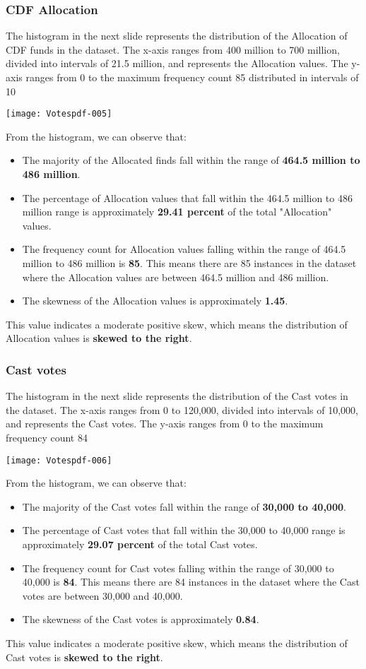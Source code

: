 \documentclass[fleqn,a4paper,12pt]{article}
\begin{document}
\subsubsection{CDF Allocation}

The histogram in the next slide represents the distribution of the Allocation of CDF funds in the dataset. The x-axis ranges from 400 million to 700 million, divided into intervals of 21.5 million, and represents the Allocation values. The y-axis ranges from 0 to the maximum frequency count 85 distributed in intervals of 10

\texttt{[image: Votespdf-005]}
 
From the histogram, we can observe that:
\begin{itemize}
\item The majority of the Allocated finds fall within the range of \textbf{464.5 million to 486 million}.
\item The percentage of Allocation values that fall within the 464.5 million to 486 million range is approximately \textbf{29.41 percent} of the total "Allocation" values.
\item The frequency count for Allocation values falling within the range of 464.5 million to 486 million is \textbf{85}. This means there are 85 instances in the dataset where the Allocation values are between 464.5 million and 486 million.
\item The skewness of the Allocation values is approximately \textbf{1.45}.
\end{itemize}
This value indicates a moderate positive skew, which means the distribution of Allocation values is \textbf{skewed to the right}.
 
\subsubsection{Cast votes}

The histogram in the next slide represents the distribution of the Cast votes in the dataset. The x-axis ranges from 0 to 120,000, divided into intervals of 10,000, and represents the Cast votes. The y-axis ranges from 0 to the maximum frequency count 84
 

\texttt{[image: Votespdf-006]}

 
From the histogram, we can observe that:
\begin{itemize}
\item The majority of the Cast votes fall within the range of \textbf{30,000 to 40,000}.
\item The percentage of Cast votes that fall within the 30,000 to 40,000 range is approximately \textbf{29.07 percent} of the total Cast votes.
\item The frequency count for Cast votes falling within the range of 30,000 to 40,000 is \textbf{84}. This means there are 84 instances in the dataset where the Cast votes are between 30,000 and 40,000.
\item The skewness of the Cast votes is approximately \textbf{0.84}.
\end{itemize}
This value indicates a moderate positive skew, which means the distribution of Cast votes is \textbf{skewed to the right}.
 
\end{document}
